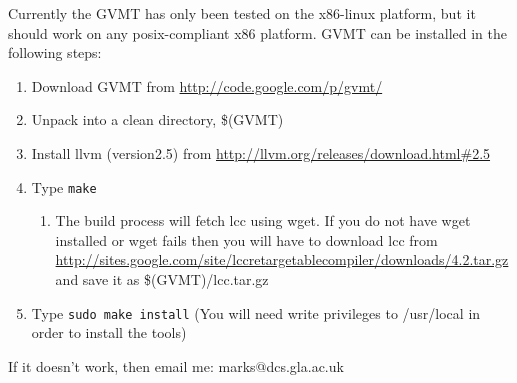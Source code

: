 Currently the GVMT has only been tested on the x86-linux platform, but it should work on any posix-compliant x86 platform.
GVMT can be installed in the following steps:
\begin{enumerate}
\item Download GVMT from \url{http://code.google.com/p/gvmt/}
\item Unpack into a clean directory, \$(GVMT)
\item Install llvm (version2.5) from \url{http://llvm.org/releases/download.html\#2.5}
\item Type \verb|make|
\begin{enumerate}
\item[] The build process will fetch lcc using wget. If you do not have wget installed or wget fails then you will have to download lcc from  \url{http://sites.google.com/site/lccretargetablecompiler/downloads/4.2.tar.gz} and save it as \$(GVMT)/lcc.tar.gz
\end{enumerate}
\item Type \verb|sudo make install| (You will need write privileges to /usr/local in order to install the tools)
\end{enumerate}

If it doesn't work, then email me: marks@dcs.gla.ac.uk

